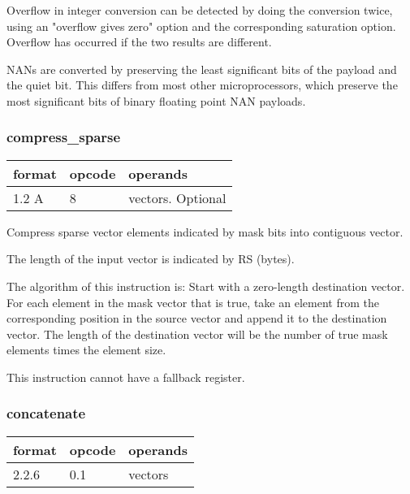 \documentclass[forwardcom.tex]{subfiles}
\begin{document}
Overflow in integer conversion can be detected by doing the conversion twice, using an "overflow gives zero" option and the corresponding saturation option. Overflow has occurred if the two results are different.
\vspace{2mm}

NANs are converted by preserving the least significant bits of the payload and the quiet bit. This differs from most other microprocessors, which preserve the most significant bits of binary floating point NAN payloads.
\vspace{2mm}


\subsubsection{compress\_sparse}
\label{table:compressSparseInstruction}
\begin{tabular}{|p{12mm}|p{12mm}|p{110mm}|}
\hline
\bfseries format & \bfseries opcode & \bfseries operands \\ \hline
1.2 A & 8 & vectors. Optional \\ \hline
\end{tabular}
\vspace{2mm}

Compress sparse vector elements indicated by mask bits into contiguous vector. 

The length of the input vector is indicated by RS (bytes).
\vspace{2mm}

The algorithm of this instruction is:
Start with a zero-length destination vector.
For each element in the mask vector that is true, take an element from the corresponding position in the source vector and append it to the destination vector.
The length of the destination vector will be the number of true mask elements
times the element size.
\vspace{2mm}

This instruction cannot have a fallback register.
\vspace{2mm}


\subsubsection{concatenate}
\label{table:concatenateInstruction}
\begin{tabular}{|p{12mm}|p{12mm}|p{110mm}|}
\hline
\bfseries format & \bfseries opcode & \bfseries operands \\ \hline
2.2.6 & 0.1 & vectors \\ \hline
\end{tabular}
\vspace{2mm}
\end{document}
